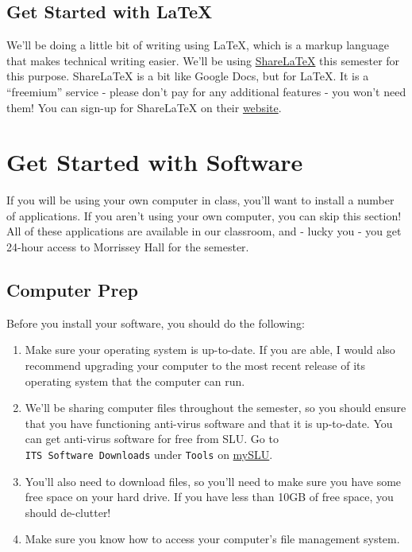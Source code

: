 \documentclass[]{book}
\theoremstyle{definition}
\theoremstyle{definition}
\theoremstyle{definition}
\theoremstyle{remark}
\begin{document}
\subsection{Get Started with LaTeX}\label{get-started-with-latex}

We'll be doing a little bit of writing using LaTeX, which is a markup
language that makes technical writing easier. We'll be using
\href{https://www.sharelatex.com}{ShareLaTeX} this semester for this
purpose. ShareLaTeX is a bit like Google Docs, but for LaTeX. It is a
``freemium'' service - please don't pay for any additional features -
you won't need them! You can sign-up for ShareLaTeX on their
\href{https://www.sharelatex.com}{website}.

\section{Get Started with Software}\label{get-started-with-software}

If you will be using your own computer in class, you'll want to install
a number of applications. If you aren't using your own computer, you can
skip this section! All of these applications are available in our
classroom, and - lucky you - you get 24-hour access to Morrissey Hall
for the semester.

\subsection{Computer Prep}\label{computer-prep}

Before you install your software, you should do the following:

\begin{enumerate}
\def\labelenumi{\arabic{enumi}.}
\item
  Make sure your operating system is up-to-date. If you are able, I
  would also recommend upgrading your computer to the most recent
  release of its operating system that the computer can run.
\item
  We'll be sharing computer files throughout the semester, so you should
  ensure that you have functioning anti-virus software and that it is
  up-to-date. You can get anti-virus software for free from SLU. Go to
  \texttt{ITS\ Software\ Downloads} under \texttt{Tools} on
  \href{https://myslu.slu.edu/tools}{mySLU}.
\item
  You'll also need to download files, so you'll need to make sure you
  have some free space on your hard drive. If you have less than 10GB of
  free space, you should de-clutter!
\item
  Make sure you know how to access your computer's file management
  system.
\end{enumerate}
\end{document}
